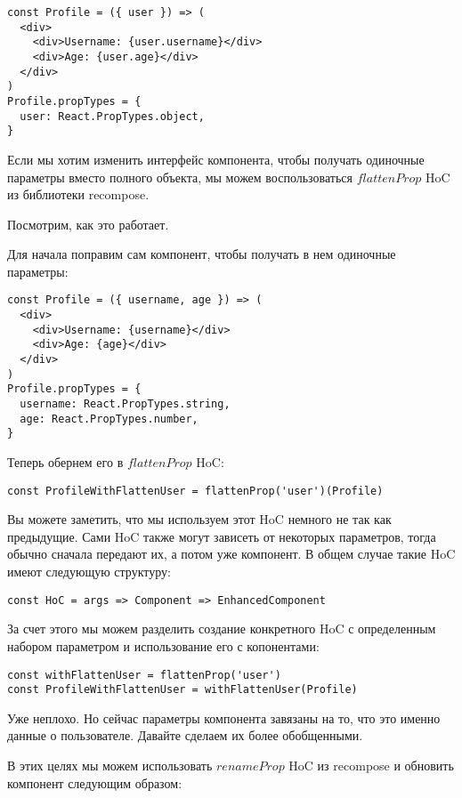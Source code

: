 \begin{lstlisting}
const Profile = ({ user }) => (
  <div>
    <div>Username: {user.username}</div>
    <div>Age: {user.age}</div>
  </div>
)
Profile.propTypes = {
  user: React.PropTypes.object,
}
\end{lstlisting}

Если мы хотим изменить интерфейс компонента, чтобы получать одиночные параметры вместо полного объекта, мы можем воспользоваться $flattenProp$ HoC из библиотеки recompose.

Посмотрим, как это работает.

Для начала поправим сам компонент, чтобы получать в нем одиночные параметры:

\begin{lstlisting}
const Profile = ({ username, age }) => (
  <div>
    <div>Username: {username}</div>
    <div>Age: {age}</div>
  </div>
)
Profile.propTypes = {
  username: React.PropTypes.string,
  age: React.PropTypes.number,
}
\end{lstlisting}

Теперь обернем его в $flattenProp$ HoC:

\begin{lstlisting}
const ProfileWithFlattenUser = flattenProp('user')(Profile)
\end{lstlisting}

Вы можете заметить, что мы используем этот HoC немного не так как предыдущие. Сами HoC также могут зависеть от некоторых параметров, тогда обычно сначала передают их, а потом уже компонент. В общем случае такие HoC имеют следующую структуру:

\begin{lstlisting}
const HoC = args => Component => EnhancedComponent
\end{lstlisting}

За счет этого мы можем разделить создание конкретного HoC с определенным набором параметром и использование его с копонентами:

\begin{lstlisting}
const withFlattenUser = flattenProp('user')
const ProfileWithFlattenUser = withFlattenUser(Profile)
\end{lstlisting}

Уже неплохо. Но сейчас параметры компонента завязаны на то, что это именно данные о пользователе. Давайте сделаем их более обобщенными.

В этих целях мы можем использовать $renameProp$ HoC из recompose и обновить компонент следующим образом:

